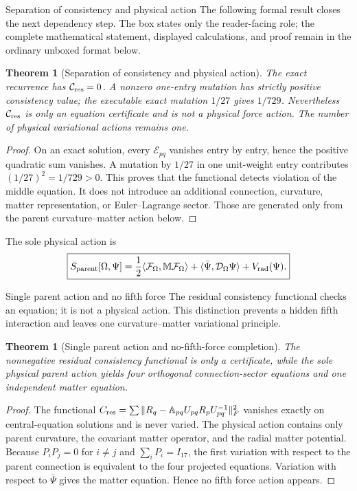 \documentclass[11pt]{article}
\numberwithin{equation}{section}
\newtheorem{theorem}[definition]{Theorem}
\theoremstyle{remark}
\begin{document}
\begin{proofguide}{Separation of consistency and physical action}
The following formal result closes the next dependency step. The box states only the reader-facing role; the complete mathematical statement, displayed calculations, and proof remain in the ordinary unboxed format below.
\end{proofguide}
\begin{theorem}[Separation of consistency and physical action]
The exact recurrence has $\mathcal C_{\rm res}=0$.  A nonzero one-entry mutation has strictly positive consistency value; the executable exact mutation $1/27$ gives $1/729$.  Nevertheless $\mathcal C_{\rm res}$ is only an equation certificate and is not a physical force action.  The number of physical variational actions remains one.
\end{theorem}
\begin{proof}
On an exact solution, every $\mathcal E_{pq}$ vanishes entry by entry, hence the positive quadratic sum vanishes.  A mutation by $1/27$ in one unit-weight entry contributes $(1/27)^2=1/729>0$.  This proves that the functional detects violation of the middle equation.  It does not introduce an additional connection, curvature, matter representation, or Euler--Lagrange sector.  Those are generated only from the parent curvature--matter action below.
\end{proof}

The sole physical action is
\begin{equation}
\boxed{S_{\rm parent}[\Omega,\Psi]
=\frac12\langle\mathcal F_\Omega,\mathbb M\mathcal F_\Omega\rangle
+\langle\bar\Psi,\mathcal D_\Omega\Psi\rangle+V_{\rm rad}(\Psi).}
\label{eq:parentactionafterresidual}
\end{equation}


\begin{proofguide}{Single parent action and no fifth force}
The residual consistency functional checks an equation; it is not a physical action. This distinction prevents a hidden fifth interaction and leaves one curvature--matter variational principle.
\end{proofguide}
\begin{theorem}[Single parent action and no-fifth-force completion]
The nonnegative residual consistency functional is only a certificate, while the sole physical parent action yields four orthogonal connection-sector equations and one independent matter equation.
\end{theorem}
\begin{proof}
The functional $C_{\rm res}=\sum\|R_q-\mathbb A_{pq}U_{pq}R_pU_{pq}^{-1}\|_F^2$ vanishes exactly on central-equation solutions and is never varied. The physical action contains only parent curvature, the covariant matter operator, and the radial matter potential. Because $P_iP_j=0$ for $i\ne j$ and $\sum_iP_i=I_{17}$, the first variation with respect to the parent connection is equivalent to the four projected equations. Variation with respect to $\bar\Psi$ gives the matter equation. Hence no fifth force action appears.
\end{proof}
\end{document}
